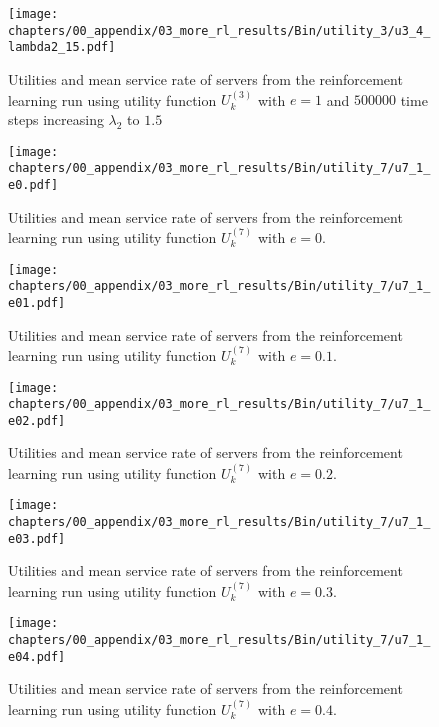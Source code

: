 \begin{figure}[H]
    \texttt{[image: chapters/00\_appendix/03\_more\_rl\_results/Bin/utility\_3/u3\_4\_lambda2\_15.pdf]}
    \caption{Utilities and mean service rate of servers from the reinforcement
    learning run using utility function \(U_k^{(3)}\) with \(e = 1\) and
    \(500000\) time steps increasing \(\lambda_2\) to \(1.5\)}
    \label{fig:RL_utility3_4_lambda2_15}
\end{figure}

\begin{figure}[H]
    \texttt{[image: chapters/00\_appendix/03\_more\_rl\_results/Bin/utility\_7/u7\_1\_e0.pdf]}
    \caption{Utilities and mean service rate of servers from the reinforcement
    learning run using utility function \(U_k^{(7)}\) with \(e = 0\).}
    \label{fig:RL_utility7_1_e0}
\end{figure}

\begin{figure}[H]
    \texttt{[image: chapters/00\_appendix/03\_more\_rl\_results/Bin/utility\_7/u7\_1\_e01.pdf]}
    \caption{Utilities and mean service rate of servers from the reinforcement
    learning run using utility function \(U_k^{(7)}\) with \(e = 0.1\).}
    \label{fig:RL_utility7_1_e01}
\end{figure}

\begin{figure}[H]
    \texttt{[image: chapters/00\_appendix/03\_more\_rl\_results/Bin/utility\_7/u7\_1\_e02.pdf]}
    \caption{Utilities and mean service rate of servers from the reinforcement
    learning run using utility function \(U_k^{(7)}\) with \(e = 0.2\).}
    \label{fig:RL_utility7_1_e02}
\end{figure}

\begin{figure}[H]
    \texttt{[image: chapters/00\_appendix/03\_more\_rl\_results/Bin/utility\_7/u7\_1\_e03.pdf]}
    \caption{Utilities and mean service rate of servers from the reinforcement
    learning run using utility function \(U_k^{(7)}\) with \(e = 0.3\).}
    \label{fig:RL_utility7_1_e03}
\end{figure}

\begin{figure}[H]
    \texttt{[image: chapters/00\_appendix/03\_more\_rl\_results/Bin/utility\_7/u7\_1\_e04.pdf]}
    \caption{Utilities and mean service rate of servers from the reinforcement
    learning run using utility function \(U_k^{(7)}\) with \(e = 0.4\).}
    \label{fig:RL_utility7_1_e04}
\end{figure}

